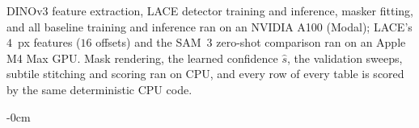 \documentclass[remotesensing,article,submit,moreauthors]{Definitions/mdpi}
\begin{document}
DINOv3 feature extraction, LACE detector training and inference, masker fitting, and all baseline training and inference ran on an NVIDIA A100 (Modal); LACE's $4$~px features ($16$ offsets) and the SAM~3 zero-shot comparison ran on an Apple M4 Max GPU. Mask rendering, the learned confidence $\hat s$, the validation sweeps, subtile stitching and scoring ran on CPU, and every row of every table is scored by the same deterministic CPU code.


\begin{adjustwidth}{-\extralength}{0cm}






\PublishersNote{}
\end{adjustwidth}
\end{document}

